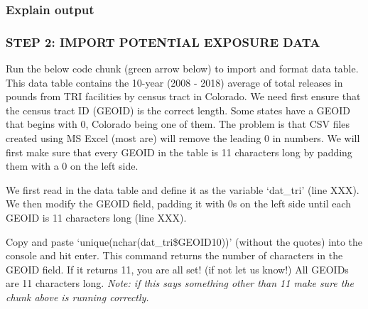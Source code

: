 \documentclass[
  12pt,
]{article}
\newenvironment{Shaded}{\begin{snugshade}}{\end{snugshade}}
\newcommand{\AttributeTok}[1]{\textcolor[rgb]{0.13,0.29,0.53}{#1}}
\newcommand{\CommentTok}[1]{\textcolor[rgb]{0.56,0.35,0.01}{\textit{#1}}}
\newcommand{\DecValTok}[1]{\textcolor[rgb]{0.00,0.00,0.81}{#1}}
\newcommand{\FunctionTok}[1]{\textcolor[rgb]{0.13,0.29,0.53}{\textbf{#1}}}
\newcommand{\NormalTok}[1]{#1}
\newcommand{\OtherTok}[1]{\textcolor[rgb]{0.56,0.35,0.01}{#1}}
\newcommand{\SpecialCharTok}[1]{\textcolor[rgb]{0.81,0.36,0.00}{\textbf{#1}}}
\newcommand{\StringTok}[1]{\textcolor[rgb]{0.31,0.60,0.02}{#1}}
\begin{document}
\hypertarget{explain-output}{%
\subsubsection{Explain output}\label{explain-output}}

\hypertarget{step-2-import-potential-exposure-data}{%
\subsubsection{STEP 2: IMPORT POTENTIAL EXPOSURE
DATA}\label{step-2-import-potential-exposure-data}}

Run the below code chunk (green arrow below) to import and format data
table. This data table contains the 10-year (2008 - 2018) average of
total releases in pounds from TRI facilities by census tract in
Colorado. We need first ensure that the census tract ID (GEOID) is the
correct length. Some states have a GEOID that begins with 0, Colorado
being one of them. The problem is that CSV files created using MS Excel
(most are) will remove the leading 0 in numbers. We will first make sure
that every GEOID in the table is 11 characters long by padding them with
a 0 on the left side.

We first read in the data table and define it as the variable `dat\_tri'
(line XXX). We then modify the GEOID field, padding it with 0s on the
left side until each GEOID is 11 characters long (line XXX).

\begin{Shaded}
\end{Shaded}

Copy and paste `unique(nchar(dat\_tri\$GEOID10))' (without the quotes)
into the console and hit enter. This command returns the number of
characters in the GEOID field. If it returns 11, you are all set! (if
not let us know!) All GEOIDs are 11 characters long. \emph{Note: if this
says something other than 11 make sure the chunk above is running
correctly.}
\end{document}

